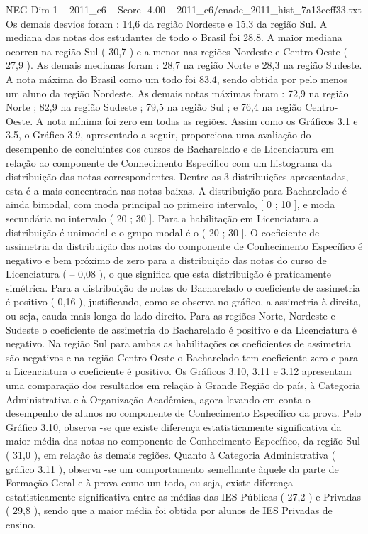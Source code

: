 \begin{textsample}{NEG Dim 1 – 2011\_c6 – Score -4.00 – 2011\_c6/enade\_2011\_hist\_7a13ceff33.txt}
Os demais desvios foram : 14,6 da região Nordeste e 15,3 da região Sul.
A mediana das notas dos estudantes de todo o Brasil foi 28,8.
A maior mediana ocorreu na região Sul ( 30,7 ) e a menor nas regiões Nordeste e Centro-Oeste ( 27,9 ).
As demais medianas foram : 28,7 na região Norte e 28,3 na região Sudeste.
A nota máxima do Brasil como um todo foi 83,4, sendo obtida por pelo menos um aluno da região Nordeste.
As demais notas máximas foram : 72,9 na região Norte ; 82,9 na região Sudeste ; 79,5 na região Sul ; e 76,4 na região Centro-Oeste.
A nota mínima foi zero em todas as regiões.
Assim como os Gráficos 3.1 e 3.5, o Gráfico 3.9, apresentado a seguir, proporciona uma avaliação do desempenho de concluintes dos cursos de Bacharelado e de Licenciatura em relação ao componente de Conhecimento Específico com um histograma da distribuição das notas correspondentes.
Dentre as 3 distribuições apresentadas, esta é a mais concentrada nas notas baixas.
A distribuição para Bacharelado é ainda bimodal, com moda principal no primeiro intervalo, [ 0 ; 10 ], e moda secundária no intervalo ( 20 ; 30 ].
Para a habilitação em Licenciatura a distribuição é unimodal e o grupo modal é o ( 20 ; 30 ].
O coeficiente de assimetria da distribuição das notas do componente de Conhecimento Específico é negativo e bem próximo de zero para a distribuição das notas do curso de Licenciatura ( – 0,08 ), o que significa que esta distribuição é praticamente simétrica.
Para a distribuição de notas do Bacharelado o coeficiente de assimetria é positivo ( 0,16 ), justificando, como se observa no gráfico, a assimetria à direita, ou seja, cauda mais longa do lado direito.
Para as regiões Norte, Nordeste e Sudeste o coeficiente de assimetria do Bacharelado é positivo e da Licenciatura é negativo.
Na região Sul para ambas as habilitações os coeficientes de assimetria são negativos e na região Centro-Oeste o Bacharelado tem coeficiente zero e para a Licenciatura o coeficiente é positivo.
Os Gráficos 3.10, 3.11 e 3.12 apresentam uma comparação dos resultados em relação à Grande Região do país, à Categoria Administrativa e à Organização Acadêmica, agora levando em conta o desempenho de alunos no componente de Conhecimento Específico da prova.
Pelo Gráfico 3.10, observa -se que existe diferença estatisticamente significativa da maior média das notas no componente de Conhecimento Específico, da região Sul ( 31,0 ), em relação às demais regiões.
Quanto à Categoria Administrativa ( gráfico 3.11 ), observa -se um comportamento semelhante àquele da parte de Formação Geral e à prova como um todo, ou seja, existe diferença estatisticamente significativa entre as médias das IES Públicas ( 27,2 ) e Privadas ( 29,8 ), sendo que a maior média foi obtida por alunos de IES Privadas de ensino.

\end{textsample}
